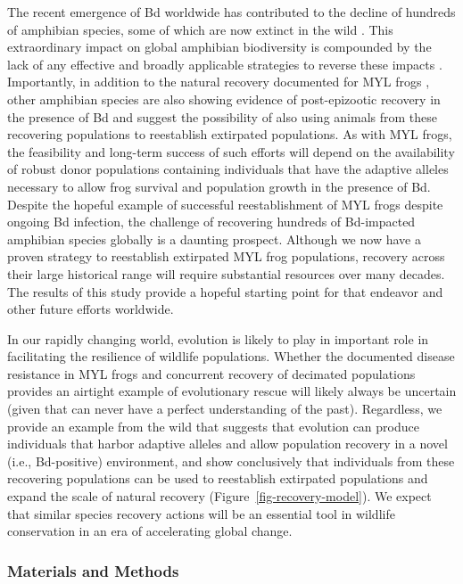 \documentclass[
  letterpaper,
  DIV=11,
  numbers=noendperiod]{scrartcl}
\begin{document}
The recent emergence of Bd worldwide has contributed to the decline of
hundreds of amphibian species, some of which are now extinct in the wild
\citep{scheele2019}. This extraordinary impact on global amphibian
biodiversity is compounded by the lack of any effective and broadly
applicable strategies to reverse these impacts
\citep{garner2016, knapp2022}. Importantly, in addition to the natural
recovery documented for MYL frogs \citep{knapp2016}, other amphibian
species are also showing evidence of post-epizootic recovery in the
presence of Bd \citep{scheele2017, voyles2018} and suggest the
possibility of also using animals from these recovering populations to
reestablish extirpated populations. As with MYL frogs, the feasibility
and long-term success of such efforts will depend on the availability of
robust donor populations containing individuals that have the adaptive
alleles necessary to allow frog survival and population growth in the
presence of Bd. Despite the hopeful example of successful
reestablishment of MYL frogs despite ongoing Bd infection, the challenge
of recovering hundreds of Bd-impacted amphibian species globally is a
daunting prospect. Although we now have a proven strategy to reestablish
extirpated MYL frog populations, recovery across their large historical
range will require substantial resources over many decades. The results
of this study provide a hopeful starting point for that endeavor and
other future efforts worldwide.

In our rapidly changing world, evolution is likely to play in important
role in facilitating the resilience of wildlife populations. Whether the
documented disease resistance in MYL frogs and concurrent recovery of
decimated populations provides an airtight example of evolutionary
rescue will likely always be uncertain (given that can never have a
perfect understanding of the past). Regardless, we provide an example
from the wild that suggests that evolution can produce individuals that
harbor adaptive alleles and allow population recovery in a novel (i.e.,
Bd-positive) environment, and show conclusively that individuals from
these recovering populations can be used to reestablish extirpated
populations and expand the scale of natural recovery
(Figure~\ref{fig-recovery-model}). We expect that similar species
recovery actions will be an essential tool in wildlife conservation in
an era of accelerating global change.

\hypertarget{materials-and-methods}{%
\subsubsection{Materials and Methods}\label{materials-and-methods}}
\end{document}
